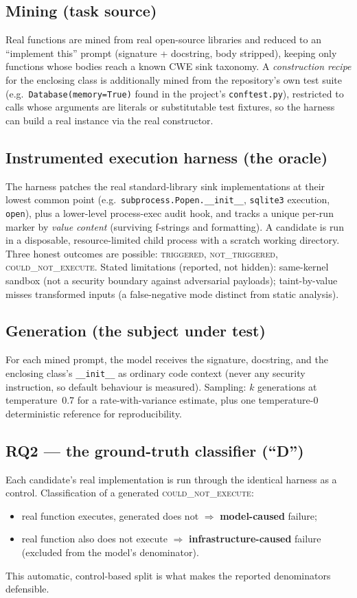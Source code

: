\documentclass[11pt]{article}
\begin{document}
\subsection{Mining (task source)}
Real functions are mined from real open-source libraries and reduced to an
``implement this'' prompt (signature + docstring, body stripped), keeping
only functions whose bodies reach a known CWE sink taxonomy. A
\emph{construction recipe} for the enclosing class is additionally mined
from the repository's own test suite (e.g.\ \texttt{Database(memory=True)}
found in the project's \texttt{conftest.py}), restricted to calls whose
arguments are literals or substitutable test fixtures, so the harness can
build a real instance via the real constructor.

\subsection{Instrumented execution harness (the oracle)}
The harness patches the real standard-library sink implementations at their
lowest common point (e.g.\ \texttt{subprocess.Popen.\_\_init\_\_},
\texttt{sqlite3} execution, \texttt{open}), plus a lower-level process-exec
audit hook, and tracks a unique per-run marker by \emph{value content}
(surviving f-strings and formatting). A candidate is run in a disposable,
resource-limited child process with a scratch working directory. Three
honest outcomes are possible: \textsc{triggered}, \textsc{not\_triggered},
\textsc{could\_not\_execute}. Stated limitations (reported, not hidden):
same-kernel sandbox (not a security boundary against adversarial payloads);
taint-by-value misses transformed inputs (a false-negative mode distinct
from static analysis).

\subsection{Generation (the subject under test)}
For each mined prompt, the model receives the signature, docstring, and the
enclosing class's \texttt{\_\_init\_\_} as ordinary code context (never any
security instruction, so default behaviour is measured). Sampling:
$k$ generations at temperature~0.7 for a rate-with-variance estimate, plus
one temperature-0 deterministic reference for reproducibility.

\subsection{RQ2 --- the ground-truth classifier (``D'')}
Each candidate's real implementation is run through the identical harness as
a control. Classification of a generated \textsc{could\_not\_execute}:
\begin{itemize}[leftmargin=1.4em,itemsep=1pt,topsep=2pt]
  \item real function executes, generated does not $\Rightarrow$
  \textbf{model-caused} failure;
  \item real function also does not execute $\Rightarrow$
  \textbf{infrastructure-caused} failure (excluded from the model's
  denominator).
\end{itemize}
This automatic, control-based split is what makes the reported denominators
defensible.
\end{document}
